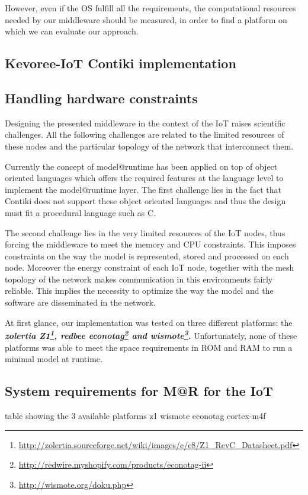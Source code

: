 However, even if the OS fulfill all the requirements, the computational resources needed by our middleware should be measured, in order to find a platform on which we can evaluate our approach.

\subsection{Kevoree-IoT Contiki implementation}


\subsection{Handling hardware constraints}
Designing the presented middleware in the context of the IoT raises scientific challenges.
All the following challenges are related to the limited resources of these nodes and the particular topology of the network that interconnect them.

Currently the concept of model@runtime has been applied on top of object oriented languages which offers the required features at the language level to implement the model@runtime layer. 
The first challenge lies in the fact that Contiki does not support these object oriented languages and thus the design must fit a procedural language such as C.

The second challenge lies in the very limited resources of the IoT nodes, thus forcing the middleware to meet the memory and CPU constraints. 
This imposes constraints on the way the model is represented, stored and processed on each node.
Moreover the energy constraint of each IoT node, together with the mesh topology of the network makes communication in this environments fairly reliable.
This implies the necessity to optimize the way the model and the software are disseminated in the network.

At first glance, our implementation was tested on three different platforms: the \textit{\textbf{zolertia Z1\footnote{\url{http://zolertia.sourceforge.net/wiki/images/e/e8/Z1_RevC_Datasheet.pdf}}, redbee econotag\footnote{\url{http://redwire.myshopify.com/products/econotag-ii}} and wismote\footnote{\url{http://wismote.org/doku.php}}.}}
Unfortunately, none of these platforms was able to meet the space requirements in ROM and RAM to run a minimal model at runtime.

\subsection{System requirements for M@R for the IoT}
table showing the 3 available platforms z1 wismote econotag cortex-m4f

